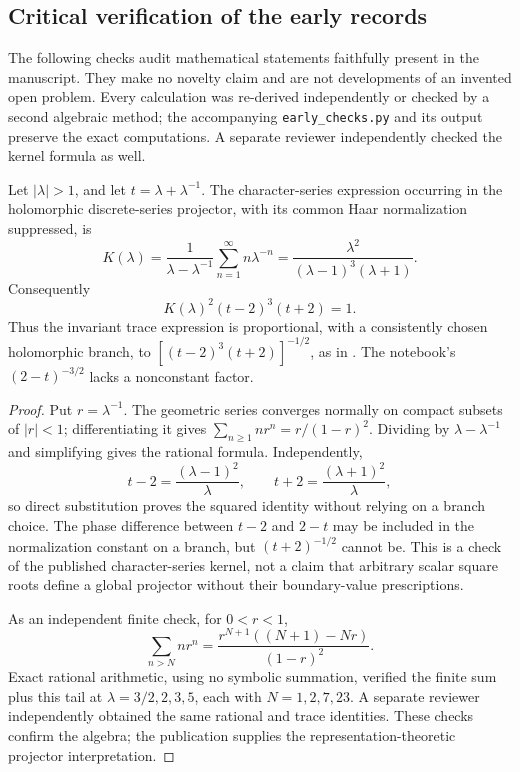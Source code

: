 \subsection{Critical verification of the early records}

The following checks audit mathematical statements faithfully present in the manuscript. They make no novelty claim and are not developments of an invented open problem. Every calculation was re-derived independently or checked by a second algebraic method; the accompanying \texttt{early\_checks.py} and its output preserve the exact computations. A separate reviewer independently checked the kernel formula as well.

\begin{proposition}\ours{}
Let \(|\lambda|>1\), and let \(t=\lambda+\lambda^{-1}\). The character-series expression occurring in the holomorphic discrete-series projector, with its common Haar normalization suppressed, is
\[
 K(\lambda)=\frac1{\lambda-\lambda^{-1}}
 \sum_{n=1}^{\infty}n\lambda^{-n}
 =\frac{\lambda^2}{(\lambda-1)^3(\lambda+1)}.
\]
Consequently
\[
 K(\lambda)^2(t-2)^3(t+2)=1.
\]
Thus the invariant trace expression is proportional, with a consistently chosen holomorphic branch, to \([(t-2)^3(t+2)]^{-1/2}\), as in \citet[Theorem~10, equations~18 and~22]{gelfandgindikin1977complex}. The notebook's \((2-t)^{-3/2}\) lacks a nonconstant factor.
\end{proposition}
\begin{proof}
Put \(r=\lambda^{-1}\). The geometric series converges normally on compact subsets of \(|r|<1\); differentiating it gives
\(\sum_{n\ge1}nr^n=r/(1-r)^2\). Dividing by \(\lambda-\lambda^{-1}\) and simplifying gives the rational formula. Independently,
\[
 t-2=\frac{(\lambda-1)^2}{\lambda},\qquad
 t+2=\frac{(\lambda+1)^2}{\lambda},
\]
so direct substitution proves the squared identity without relying on a branch choice. The phase difference between \(t-2\) and \(2-t\) may be included in the normalization constant on a branch, but \((t+2)^{-1/2}\) cannot be. This is a check of the published character-series kernel, not a claim that arbitrary scalar square roots define a global projector without their boundary-value prescriptions.

As an independent finite check, for \(0<r<1\),
\[
 \sum_{n>N}nr^n=\frac{r^{N+1}((N+1)-Nr)}{(1-r)^2}.
\]
Exact rational arithmetic, using no symbolic summation, verified the finite sum plus this tail at \(\lambda=3/2,2,3,5\), each with \(N=1,2,7,23\). A separate reviewer independently obtained the same rational and trace identities. These checks confirm the algebra; the publication supplies the representation-theoretic projector interpretation.
\end{proof}

